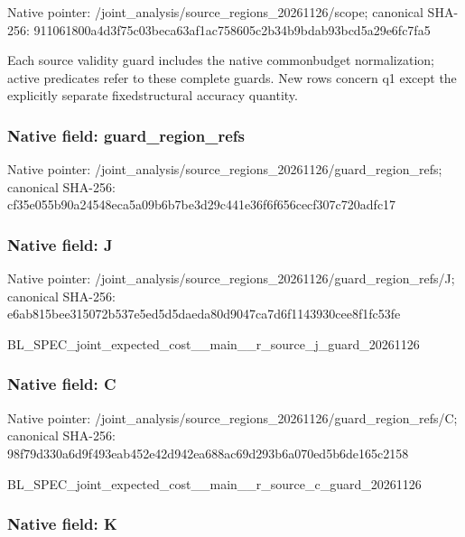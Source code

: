 \documentclass[10pt,a4paper]{article}
\begin{document}
Native pointer: /joint\_analysis/source\_r\allowbreak{}egions\_20261126/scope; canonical SHA-256: 911061800a4d3f75c03beca6\allowbreak{}3af1ac758605c2b34b9bdab9\allowbreak{}3bcd5a29e6fc7fa5


Each source validity guard includes the native commonbudget normalization; active predicates refer to these complete guards. New rows concern q1 except the explicitly separate fixedstructural accuracy quantity.


\subsubsection{Native field: guard\_region\_refs}


Native pointer: /joint\_analysis/source\_r\allowbreak{}egions\_20261126/guard\_re\allowbreak{}gion\_refs; canonical SHA-256: cf35e055b90a24548eca5a09\allowbreak{}b6b7be3d29c441e36f6f656c\allowbreak{}ecf307c720adfc17



\subsubsection{Native field: J}


Native pointer: /joint\_analysis/source\_r\allowbreak{}egions\_20261126/guard\_re\allowbreak{}gion\_refs/J; canonical SHA-256: e6ab815bee315072b537e5ed\allowbreak{}5d5daeda80d9047ca7d6f114\allowbreak{}3930cee8f1fc53fe


BL\_SPEC\_joint\_expected\_c\allowbreak{}ost\_\_main\_\_r\_source\_j\_gu\allowbreak{}ard\_20261126


\subsubsection{Native field: C}


Native pointer: /joint\_analysis/source\_r\allowbreak{}egions\_20261126/guard\_re\allowbreak{}gion\_refs/C; canonical SHA-256: 98f79d330a6d9f493eab452e\allowbreak{}42d942ea688ac69d293b6a07\allowbreak{}0ed5b6de165c2158


BL\_SPEC\_joint\_expected\_c\allowbreak{}ost\_\_main\_\_r\_source\_c\_gu\allowbreak{}ard\_20261126


\subsubsection{Native field: K}
\end{document}
